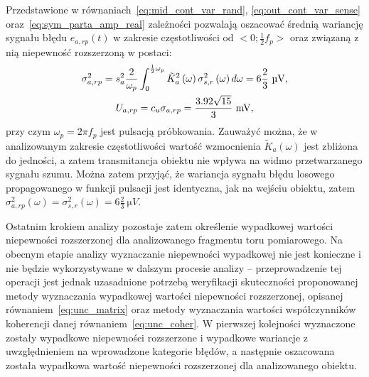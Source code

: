 Przedstawione w równaniach~\eqref{eq:mid_cont_var_rand}, \eqref{eq:out_cont_var_sense} oraz~\eqref{eq:sym_parta_amp_real} zależności pozwalają oszacować średnią wariancję sygnału błędu $e_{a,rp}(t)$ w zakresie częstotliwości od $<0;\frac{1}{2}f_{p}>$ oraz związaną z nią niepewność rozszerzoną w postaci:
\begin{gather}
\sigma_{a,rp}^{2} = s_{a}^{2} \frac{2}{\omega_{p}} \int _{0} ^{\frac{1}{2}\omega_{p}} \tilde{K}_{a}^{2} \emb{\omega} \sigma_{s,r}^{2} \emb{\omega} d\omega = 6 \frac{2}{3}~\unit{\micro V} \label{eq:sym_parta_rand_prop_var}, \\
U_{a,rp} = c_{u} \sigma_{a,rp} = \frac{3.92 \sqrt{15}}{3}~\unit{mV} \label{eq:sym_parta_rand_prop_unc},
\end{gather}
przy czym $\omega_{p} = 2 \pi f_{p}$ jest pulsacją próbkowania. Zauważyć można, że w analizowanym zakresie częstotliwości wartość wzmocnienia $\tilde{K}_{a}(\omega)$ jest zbliżona do jedności, a zatem transmitancja obiektu nie wpływa na widmo przetwarzanego sygnału szumu. Można zatem przyjąć, że wariancja sygnału błędu losowego propagowanego w funkcji pulsacji jest identyczna, jak na wejściu obiektu, zatem $\sigma_{a,rp}^{2}(\omega) = \sigma_{s,r}^{2}(\omega) = 6 \frac{2}{3}~\unit{\micro V}$.

Ostatnim krokiem analizy pozostaje zatem określenie wypadkowej wartości niepewności rozszerzonej dla analizowanego fragmentu toru pomiarowego. Na obecnym etapie analizy wyznaczanie niepewności wypadkowej nie jest konieczne i nie będzie wykorzystywane w dalszym procesie analizy -- przeprowadzenie tej operacji jest jednak uzasadnione potrzebą weryfikacji skuteczności proponowanej metody wyznaczania wypadkowej wartości niepewności rozszerzonej, opisanej równaniem~\eqref{eq:unc_matrix} oraz metody wyznaczania wartości współczynników koherencji danej równaniem~\eqref{eq:unc_coher}. W pierwszej kolejności wyznaczone zostały wypadkowe niepewności rozszerzone i wypadkowe wariancje z uwzględnieniem na wprowadzone kategorie błędów, a następnie oszacowana została wypadkowa wartość niepewności rozszerzonej dla analizowanego obiektu.

